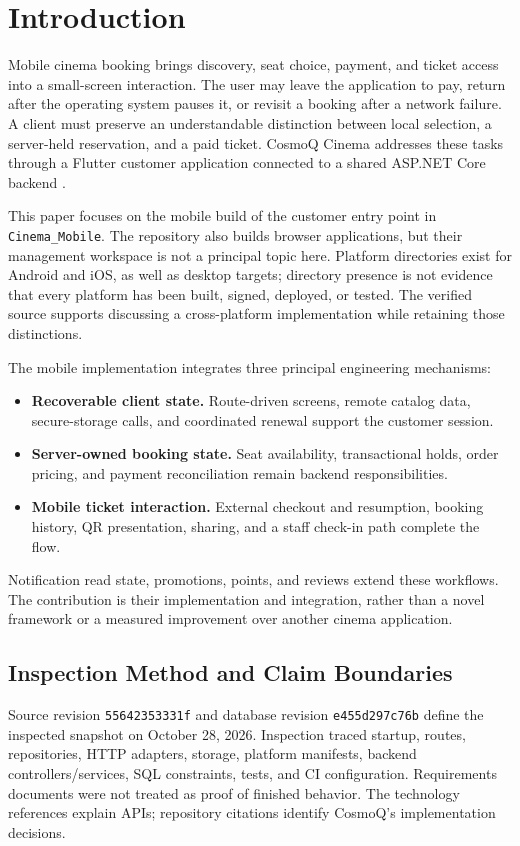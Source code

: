 \documentclass[conference]{IEEEtran}
\newenvironment{keypoints}{\begin{itemize}\setlength{\itemsep}{2pt}%
\setlength{\parsep}{0pt}}{\end{itemize}}
\newcommand{\code}[1]{\texttt{#1}}
\begin{document}
\section{Introduction}
Mobile cinema booking brings discovery, seat choice, payment, and ticket access
into a small-screen interaction. The user may leave the application to pay,
return after the operating system pauses it, or revisit a booking after a
network failure. A client must preserve an understandable distinction between
local selection, a server-held reservation, and a paid ticket. CosmoQ Cinema
addresses these tasks through a Flutter customer application connected to a
shared ASP.NET Core backend \cite{client,booking}.

This paper focuses on the mobile build of the customer entry point in
\code{Cinema\_Mobile}. The repository also builds browser applications, but
their management workspace is not a principal topic here. Platform directories
exist for Android and iOS, as well as desktop targets; directory presence is
not evidence that every platform has been built, signed, deployed, or tested.
The verified source supports discussing a cross-platform implementation while
retaining those distinctions.

The mobile implementation integrates three principal engineering mechanisms:
\begin{keypoints}
\item \textbf{Recoverable client state.} Route-driven screens, remote catalog
data, secure-storage calls, and coordinated renewal support the customer session.
\item \textbf{Server-owned booking state.} Seat availability, transactional
holds, order pricing, and payment reconciliation remain backend responsibilities.
\item \textbf{Mobile ticket interaction.} External checkout and resumption,
booking history, QR presentation, sharing, and a staff check-in path complete the flow.
\end{keypoints}
Notification read state, promotions, points, and reviews extend these workflows.
The contribution is their implementation and integration, rather than a novel
framework or a measured improvement over another cinema application.

\subsection{Inspection Method and Claim Boundaries}
Source revision \code{55642353331f} and database revision
\code{e455d297c76b} define the inspected snapshot on October 28, 2026.
Inspection traced startup, routes, repositories, HTTP adapters, storage,
platform manifests, backend controllers/services, SQL constraints, tests, and
CI configuration. Requirements documents were not treated as proof of finished
behavior. The technology references explain APIs; repository citations identify
CosmoQ's implementation decisions.
\end{document}
